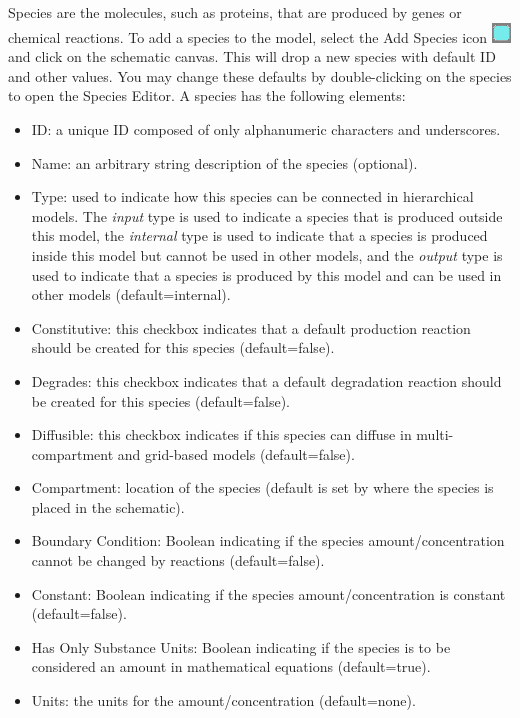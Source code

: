 \documentclass[titlepage,11pt]{article}
\begin{document}
\noindent
Species are the molecules, such as proteins, that are produced by genes or chemical reactions.  To add a species to the model, select the Add Species icon \includegraphics{../gui/icons/modelview/add_species_selected} and click on the schematic canvas.  This will drop a new species with default ID and other values.  You may change these defaults by double-clicking on the species to open the Species Editor.  A species has the following elements:
\begin{itemize} 
\item ID: a unique ID composed of only alphanumeric characters and underscores.
\item Name: an arbitrary string description of the species (optional).
\item Type: used to indicate how this species can be connected in hierarchical models.  The \emph{input} type is used to indicate a species that is produced outside this model, the \emph{internal} type is used to indicate that a species is produced inside this model but cannot be used in other models, and the \emph{output} type is used to indicate that a species is produced by this model and can be used in other models (default=internal). 
\item Constitutive: this checkbox indicates that a default production reaction should be created for this species (default=false).
\item Degrades: this checkbox indicates that a default degradation reaction should be created for this species (default=false).
\item Diffusible: this checkbox indicates if this species can diffuse in multi-compartment and grid-based models (default=false).
\item Compartment: location of the species (default is set by where the species is placed in the schematic).
\item Boundary Condition: Boolean indicating if the species amount/concentration cannot be changed by reactions (default=false).
\item Constant: Boolean indicating if the species amount/concentration is constant (default=false).
\item Has Only Substance Units: Boolean indicating if the species is to be considered an amount in mathematical equations (default=true).
\item Units: the units for the amount/concentration (default=none).

\end{itemize}
\end{document}
